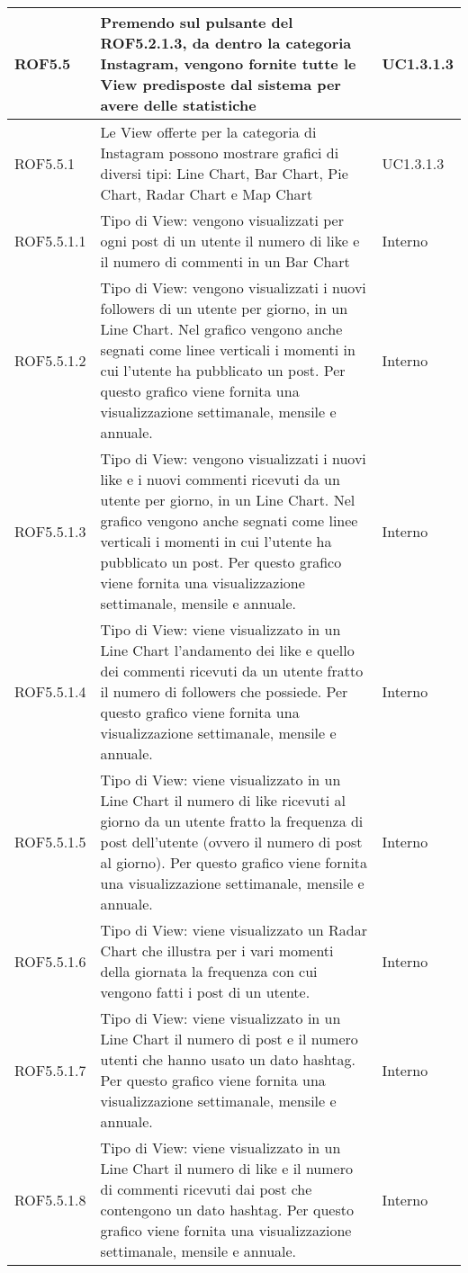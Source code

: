 \begin{center}
\begin{longtable}{| p{2.5cm} | p{8cm} | p{2cm} |}
		ROF5.5  &  Premendo sul pulsante del ROF5.2.1.3, da dentro la categoria Instagram, vengono fornite tutte le View predisposte dal sistema per avere delle statistiche &  UC1.3.1.3  \\
		\hline
		ROF5.5.1  & Le View offerte per la categoria di Instagram possono mostrare grafici di diversi tipi: Line Chart, Bar Chart, Pie Chart, Radar Chart e Map Chart  &  UC1.3.1.3  \\
		\hline
		ROF5.5.1.1  &  Tipo di View: vengono visualizzati per ogni post di un utente il numero di like e il numero di commenti in un Bar Chart & Interno \\
		\hline
		ROF5.5.1.2  &  Tipo di View: vengono visualizzati i nuovi followers di un utente per giorno, in un Line Chart. Nel grafico vengono anche segnati come linee verticali i momenti in cui l'utente ha pubblicato un post. Per questo grafico viene fornita una visualizzazione settimanale, mensile e annuale. & Interno \\
		\hline
		ROF5.5.1.3  &  Tipo di View: vengono visualizzati i nuovi like e i nuovi commenti ricevuti da un utente per giorno, in un Line Chart. Nel grafico vengono anche segnati come linee verticali i momenti in cui l'utente ha pubblicato un post. Per questo grafico viene fornita una visualizzazione settimanale, mensile e annuale. & Interno \\
		\hline
		ROF5.5.1.4  & Tipo di View: viene visualizzato in un Line Chart l'andamento dei like e quello dei commenti ricevuti da un utente fratto il numero di followers che possiede. Per questo grafico viene fornita una visualizzazione settimanale, mensile e annuale. & Interno \\
		\hline
		ROF5.5.1.5  &  Tipo di View: viene visualizzato in un Line Chart il numero di like ricevuti al giorno da un utente fratto la frequenza di post dell'utente (ovvero il numero di post al giorno). Per questo grafico viene fornita una visualizzazione settimanale, mensile e annuale. & Interno \\
		\hline
		ROF5.5.1.6  &  Tipo di View: viene visualizzato un Radar Chart che illustra per i vari momenti della giornata la frequenza con cui vengono fatti i post di un utente. & Interno \\
		\hline
		ROF5.5.1.7  &  Tipo di View: viene visualizzato in un Line Chart il numero di post e il numero utenti che hanno usato un dato hashtag. Per questo grafico viene fornita una visualizzazione settimanale, mensile e annuale. & Interno \\
		\hline
		ROF5.5.1.8  &  Tipo di View: viene visualizzato in un Line Chart il numero di like e il numero di commenti ricevuti dai post che contengono un dato hashtag. Per questo grafico viene fornita una visualizzazione settimanale, mensile e annuale. & Interno \\

\end{longtable}
\end{center}
